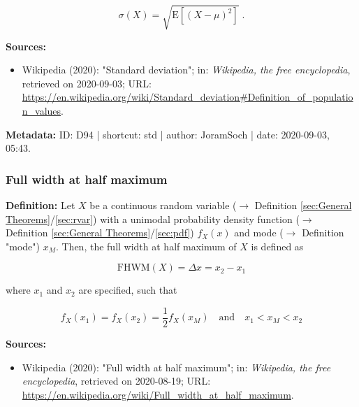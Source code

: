 \documentclass[a4paper,12pt,twoside]{book}
\begin{document}
\begin{equation} \label{eq:std-std}
\sigma(X) = \sqrt{\mathrm{E}\left[ (X-\mu)^2 \right]} \; .
\end{equation}


\vspace{1em}
\textbf{Sources:}
\begin{itemize}
\item Wikipedia (2020): "Standard deviation"; in: \textit{Wikipedia, the free encyclopedia}, retrieved on 2020-09-03; URL: \url{https://en.wikipedia.org/wiki/Standard_deviation#Definition_of_population_values}.
\end{itemize}


\vspace{1em}
\textbf{Metadata:} ID: D94 | shortcut: std | author: JoramSoch | date: 2020-09-03, 05:43.
\vspace{1em}



\subsubsection[\textit{Full width at half maximum}]{Full width at half maximum} \label{sec:fwhm}
\setcounter{equation}{0}

\textbf{Definition:} Let $X$ be a continuous random variable ($\rightarrow$ Definition \ref{sec:General Theorems}/\ref{sec:rvar}) with a unimodal probability density function ($\rightarrow$ Definition \ref{sec:General Theorems}/\ref{sec:pdf}) $f_X(x)$ and mode ($\rightarrow$ Definition "mode") $x_M$. Then, the full width at half maximum of $X$ is defined as

\begin{equation} \label{eq:fwhm-FWHM}
\mathrm{FHWM}(X) = \Delta x = x_2 - x_1
\end{equation}

where $x_1$ and $x_2$ are specified, such that

\begin{equation} \label{eq:fwhm-x12}
f_X(x_1) = f_X(x_2) = \frac{1}{2} f_X(x_M) \quad \text{and} \quad x_1 < x_M < x_2
\end{equation}


\vspace{1em}
\textbf{Sources:}
\begin{itemize}
\item Wikipedia (2020): "Full width at half maximum"; in: \textit{Wikipedia, the free encyclopedia}, retrieved on 2020-08-19; URL: \url{https://en.wikipedia.org/wiki/Full_width_at_half_maximum}.
\end{itemize}
\end{document}
